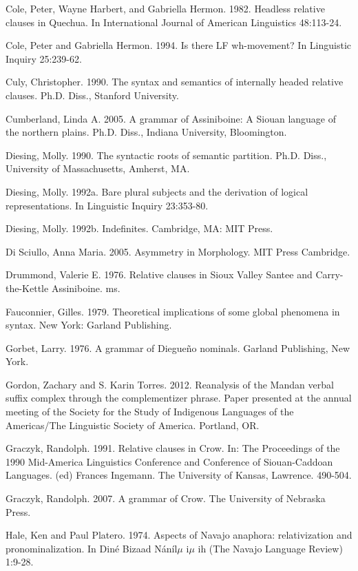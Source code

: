 \documentclass[output=paper]{LSP/langsci}
\begin{document}
\begin{reflist}
Cole, Peter, Wayne Harbert, and Gabriella Hermon. 1982. Headless relative clauses in Quechua. In International Journal of American Linguistics 48:113-24.

Cole, Peter and Gabriella Hermon. 1994. Is there LF wh-movement? In Linguistic Inquiry 25:239-62.

Culy, Christopher. 1990. The syntax and semantics of internally headed relative clauses.  Ph.D. Diss., Stanford University.

Cumberland, Linda A. 2005. A grammar of Assiniboine: A Siouan language of the northern plains.  Ph.D. Diss., Indiana University, Bloomington.

Diesing, Molly. 1990. The syntactic roots of semantic partition. Ph.D. Diss., University of Massachusetts, Amherst, MA.

Diesing, Molly. 1992a. Bare plural subjects and the derivation of logical representations. In Linguistic Inquiry 23:353-80.

Diesing, Molly. 1992b. Indefinites. Cambridge, MA: MIT Press.

Di Sciullo, Anna Maria. 2005. Asymmetry in Morphology. MIT Press Cambridge.

Drummond, Valerie E. 1976. Relative clauses in Sioux Valley Santee and Carry-the-Kettle Assiniboine. ms.

Fauconnier, Gilles. 1979. Theoretical implications of some global phenomena in syntax. New York: Garland Publishing.

Gorbet, Larry. 1976. A grammar of Diegue\~no nominals. Garland Publishing, New York.

Gordon, Zachary and S. Karin Torres. 2012. Reanalysis of the Mandan verbal suffix complex through the complementizer phrase. Paper presented at the annual meeting of the Society for the Study of Indigenous Languages of the Americas/The Linguistic Society of America. Portland, OR.

Graczyk, Randolph. 1991. Relative clauses in Crow. In: The Proceedings of the 1990 Mid-America Linguistics Conference and Conference of Siouan-Caddoan Languages. (ed) Frances Ingemann. The University of Kansas, Lawrence. 490-504. 

Graczyk, Randolph. 2007. A grammar of Crow. The University of Nebraska Press.

Hale, Ken and Paul Platero. 1974. Aspects of Navajo anaphora: relativization and pronominalization.  In Din\'e Bizaad N\'an\'il$\mu$ i$\mu$ ih (The Navajo Language Review) 1:9-28.


\end{reflist}
\end{document}
